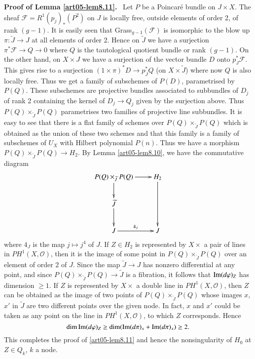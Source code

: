 \medskip
\noindent
{\bf Proof of Lemma \ref{art05-lem8.11}.}~
Let $P$ be a Poincar\'e bundle on $J\times X$. The sheaf
$\mathscr{F}=R^{1}(p_{j})_{*}(P^{2})$ on $J$ is locally free, outside
elements of order 2, of rank $(g-1)$. It is easily seen that
Grass$_{g-1}(\mathscr{F})$ is isomorphic to the blow up
$\pi:\widetilde{J}\to J$ at all elements of order 2. Hence on
$\widetilde{J}$ we have a surjection $\pi^{*}\mathscr{F}\to Q\to 0$
where $Q$ is the tautological quotient bundle or rank $(g-1)$. On the
other hand, on $X\times J$ we have a surjection of the\pageoriginale
vector bundle $D$ onto $p^{*}_{J}\mathscr{F}$. This gives rise to a
surjection $(1\times \pi)^{*}D\to p^{*}_{\widetilde{J}}Q$ (on
$X\times \widetilde{J}$) where now $Q$ is also locally free. Thus we
get a family of subschemes of $P(D)$, parametrised by $P(Q)$. These
subschemes are projective bundles associated to subbundles of $D_{j}$
of rank 2 containing the kernel of $D_{j}\to Q_{j}$ given by the
surjection above. Thus $P(Q)\times_{\widetilde{J}}P(Q)$ parametrises
two families of projective line subbundles. It is easy to see that
there is a flat family of schemes over
$P(Q)\times_{\widetilde{J}}P(Q)$ which is obtained as the union of
these two schemes and that this family is a family of subschemes of
$U_{X}$ with Hilbert polynomial $P(n)$. Thus we have a morphism
$P(Q)\times_{\widetilde{J}}P(Q)\to H_{2}$. By
Lemma \ref{art05-lem8.10}, we have the commutative diagram
\[
\xymatrix{
P(Q)\times_{\widetilde{J}}P(Q)\ar[d]\ar[r] & H_{2}\ar[dd]\\
\widetilde{J}\ar[d] & \\
J\ar[r]^-{4_{J}} & J
}
\]
where $4_{J}$ is the map $j\mapsto j^{4}$ of $J$. If $Z\in H_{2}$ is
represented by $X\times$ a pair of lines in $PH^{1}(X,\mathscr{O})$,
then it is the image of some point in $P(Q)\times_{\widetilde{J}}P(Q)$
over an element of order 2 of $J$. Since the map $\widetilde{J}\to J$
has nonzero differential at any point, and since
$P(Q)\times_{\widetilde{J}}P(Q)\to \widetilde{J}$ is a fibration, it
follows that $\operatorname{Im} (d\varphi)_{Z}$ has dimension $\geq 1$. If $Z$ is
represented by $X\times$ a double line in $PH^{1}(X,\mathscr{O})$,
then $Z$ can be obtained as the image of two points of
$P(Q)\times_{\widetilde{J}}P(Q)$ whose images $x$, $x'$ in
$\widetilde{J}$ are two different points over the given node. In fact,
$x$ and $x'$ could be taken as any point on the line in
$PH^{1}(X,\mathscr{O})$, to which $Z$ corresponds. Hence
$$
\dim \operatorname{Im} (d\varphi)_{Z}\geq \dim (\operatorname{Im}(d\pi)_{x}+\operatorname{Im}(d\pi)_{x})\geq 2.
$$
This completes the proof of \ref{art05-lem8.11} and hence the
nonsingularity of $H_{0}$ at $Z\in Q_{k}$, $k$ a node.

